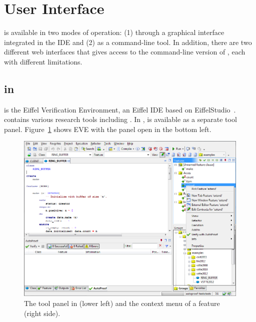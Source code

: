 \section{User Interface}
\label{sec:ap-interface}

\AutoProof is available in two modes of operation: (1) through a graphical interface integrated in the \EVE IDE and (2) as a command-line tool. In addition, there are two different web interfaces that gives access to the command-line version of \AutoProof, each with different limitations.


\subsection{\AutoProof in \EVE}

\EVE is the Eiffel Verification Environment, an Eiffel IDE based on EiffelStudio~\cite{EIFFELSTUDIO}. \EVE contains various research tools including \AutoProof. In \EVE, \AutoProof is available as a separate tool panel. Figure~\ref{fig:eve-tool-panel} shows EVE with the \AutoProof panel open in the bottom left. 

\begin{figure}[ht]
\centering
\includegraphics[width=\textwidth]{images/eve_layout_with_context_menu.png}
\caption{The \AutoProof tool panel in \EVE (lower left) and the context menu of a feature (right side).}
\label{fig:eve-tool-panel}
\end{figure}

